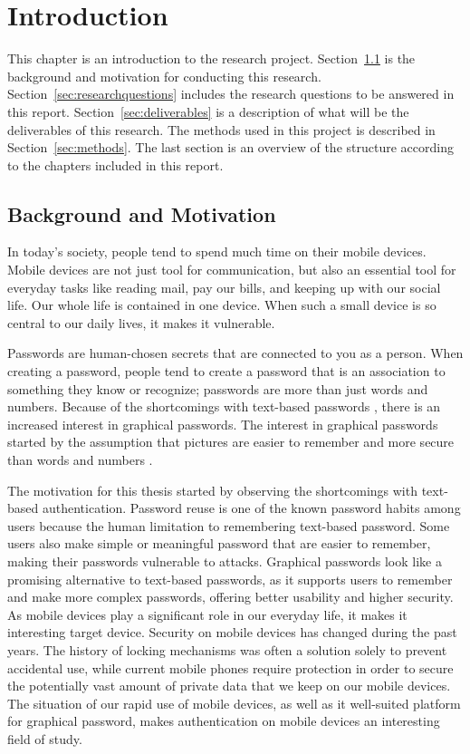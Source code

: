 \chapter{Introduction}

  This chapter is an introduction to the research project. Section~\ref{sec:background} is the background and motivation for conducting this research. Section~\ref{sec:researchquestions} includes the research questions to be answered in this report. Section~\ref{sec:deliverables} is a description of what will be the deliverables of this research.
  The methods used in this project is described in Section~\ref{sec:methods}. The last section is an overview of the structure according to the chapters included in this report. 

  \clearpage
  \section{Background and Motivation} \label{sec:background}
  In today's society, people tend to spend much time on their mobile devices. Mobile devices are not just tool for communication, but also an essential tool for everyday tasks like reading mail, pay our bills, and keeping up with our social life. Our whole life is contained in one device. When such a small device is so central to our daily lives, it makes it vulnerable.

  Passwords are human-chosen secrets that are connected to you as a person. When creating a password, people tend to create a password that is an association to something they know or recognize; passwords are more than just words and numbers. Because of the shortcomings with text-based passwords \cite{UnixPasswords}, there is an increased interest in graphical passwords. The interest in graphical passwords started by the assumption that pictures are easier to remember and more secure than words and numbers \cite{DeAngeli}.

  The motivation for this thesis started by observing the shortcomings with text-based authentication. Password reuse is one of the known password habits among users because the human limitation to remembering text-based password. Some users also make simple or meaningful password that are easier to remember, making their passwords vulnerable to attacks. Graphical passwords look like a promising alternative to text-based passwords, as it supports users to remember and make more complex passwords, offering better usability and higher security. As mobile devices play a significant role in our everyday life, it makes it interesting target device. Security on mobile devices has changed during the past years. The history of locking mechanisms was often a solution solely to prevent accidental use, while current mobile phones require protection in order to secure the potentially vast amount of private data that we keep on our mobile devices. The situation of our rapid use of mobile devices, as well as it well-suited platform for graphical password, makes authentication on mobile devices an interesting field of study.

